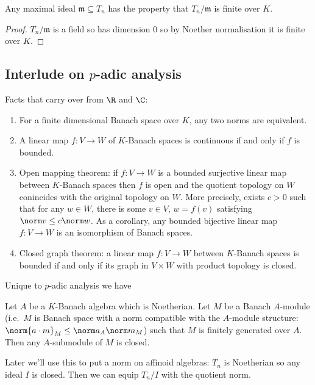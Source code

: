 \documentclass[a4paper]{article}
\begin{document}
\begin{corollary}
  Any maximal ideal \(\mathfrak m \subseteq T_n\) has the property that \(T_n/\mathfrak m\) is finite over \(K\).
\end{corollary}

\begin{proof}
  \(T_n/\mathfrak m\) is a field so has dimension \(0\) so by Noether normalisation it is finite over \(K\).
\end{proof}

\subsection{Interlude on \(p\)-adic analysis}

Facts that carry over from \(\R\) and \(\C\):
\begin{enumerate}
\item For a finite dimensional Banach space over \(K\), any two norms are equivalent.
\item A linear map \(f: V \to W\) of \(K\)-Banach spaces is continuous if and only if \(f\) is bounded.
\item Open mapping theorem: if \(f: V \to W\) is a bounded surjective linear map between \(K\)-Banach spaces then \(f\) is open and the quotient topology on \(W\) conincides with the original topology on \(W\). More precisely, exists \(c > 0\) such that for any \(w \in W\), there is some \(v \in V\), \(w = f(v)\) satisfying \(\norm v \leq c \norm w\). As a corollary, any bounded bijective linear map \(f: V \to W\) is an isomorphism of Banach spaces.
\item Closed graph theorem: a linear map \(f: V \to W\) between \(K\)-Banach spaces is bounded if and only if its graph in \(V \times W\) with product topology is closed.
\end{enumerate}

Unique to \(p\)-adic analysis we have

\begin{lemma}
  Let \(A\) be a \(K\)-Banach algebra which is Noetherian. Let \(M\) be a Banach \(A\)-module (i.e.\ \(M\) is Banach space with a norm compatible with the \(A\)-module structure: \(\norm{a \cdot m}_M \leq \norm a_A \norm m_M\)) such that \(M\) is finitely generated over \(A\). Then any \(A\)-submodule of \(M\) is closed.
\end{lemma}

Later we'll use this to put a norm on affinoid algebras: \(T_n\) is Noetherian so any ideal \(I\) is closed. Then we can equip \(T_n/I\) with the quotient norm.
\end{document}
